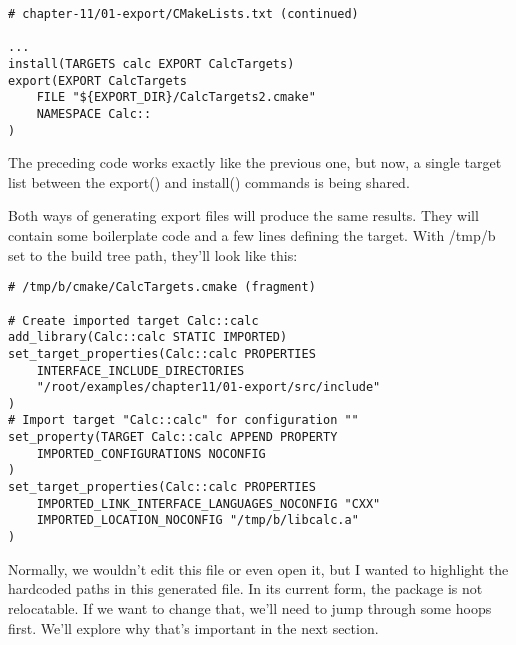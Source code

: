 \begin{lstlisting}[style=styleCMake]
# chapter-11/01-export/CMakeLists.txt (continued)

...
install(TARGETS calc EXPORT CalcTargets)
export(EXPORT CalcTargets
	FILE "${EXPORT_DIR}/CalcTargets2.cmake"
	NAMESPACE Calc::
)
\end{lstlisting}

The preceding code works exactly like the previous one, but now, a single target list between the export() and install() commands is being shared.

Both ways of generating export files will produce the same results. They will contain some boilerplate code and a few lines defining the target. With /tmp/b set to the build tree path, they'll look like this:

\begin{lstlisting}[style=styleCMake]
# /tmp/b/cmake/CalcTargets.cmake (fragment)

# Create imported target Calc::calc
add_library(Calc::calc STATIC IMPORTED)
set_target_properties(Calc::calc PROPERTIES
	INTERFACE_INCLUDE_DIRECTORIES
	"/root/examples/chapter11/01-export/src/include"
)
# Import target "Calc::calc" for configuration ""
set_property(TARGET Calc::calc APPEND PROPERTY
	IMPORTED_CONFIGURATIONS NOCONFIG
)
set_target_properties(Calc::calc PROPERTIES
	IMPORTED_LINK_INTERFACE_LANGUAGES_NOCONFIG "CXX"
	IMPORTED_LOCATION_NOCONFIG "/tmp/b/libcalc.a"
)
\end{lstlisting}

Normally, we wouldn't edit this file or even open it, but I wanted to highlight the hardcoded paths in this generated file. In its current form, the package is not relocatable. If we want to change that, we'll need to jump through some hoops first. We'll explore why that's important in the next section.












